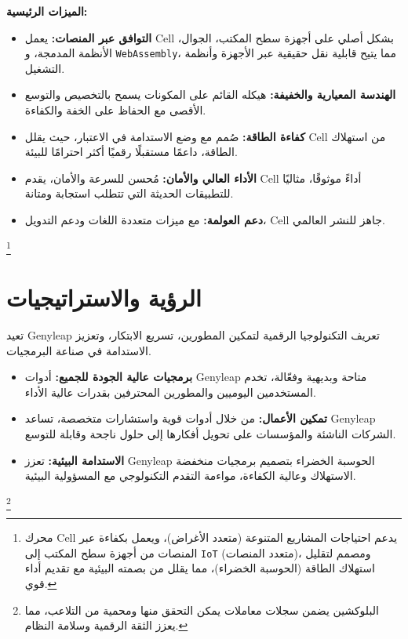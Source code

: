 \documentclass[a4paper,12pt,openany]{book}
\begin{document}
\textbf{الميزات الرئيسية:}
\begin{itemize}
    \item \textbf{التوافق عبر المنصات:} يعمل Cell بشكل أصلي على أجهزة سطح المكتب، الجوال، الأنظمة المدمجة، و \texttt{WebAssembly}، مما يتيح قابلية نقل حقيقية عبر الأجهزة وأنظمة التشغيل.
    \item \textbf{الهندسة المعيارية والخفيفة:} هيكله القائم على المكونات يسمح بالتخصيص والتوسع الأقصى مع الحفاظ على الخفة والكفاءة.
    \item \textbf{كفاءة الطاقة:} صُمم مع وضع الاستدامة في الاعتبار، حيث يقلل Cell من استهلاك الطاقة، داعمًا مستقبلًا رقميًا أكثر احترامًا للبيئة.
    \item \textbf{الأداء العالي والأمان:} مُحسن للسرعة والأمان، يقدم Cell أداءً موثوقًا، مثاليًا للتطبيقات الحديثة التي تتطلب استجابة ومتانة.
    \item \textbf{دعم العولمة:} مع ميزات متعددة اللغات ودعم التدويل، Cell جاهز للنشر العالمي.
\end{itemize}

\footnote{محرك Cell يدعم احتياجات المشاريع المتنوعة (متعدد الأغراض)، ويعمل بكفاءة عبر المنصات من أجهزة سطح المكتب إلى \texttt{IoT} (متعدد المنصات)، ومصمم لتقليل استهلاك الطاقة (الحوسبة الخضراء)، مما يقلل من بصمته البيئية مع تقديم أداء قوي.}

\chapter{الرؤية والاستراتيجيات}

تعيد Genyleap تعريف التكنولوجيا الرقمية لتمكين المطورين، تسريع الابتكار، وتعزيز الاستدامة في صناعة البرمجيات.

\begin{itemize}
    \item \textbf{برمجيات عالية الجودة للجميع:} أدوات Genyleap متاحة وبديهية وفعّالة، تخدم المستخدمين اليوميين والمطورين المحترفين بقدرات عالية الأداء.
    \item \textbf{تمكين الأعمال:} من خلال أدوات قوية واستشارات متخصصة، تساعد Genyleap الشركات الناشئة والمؤسسات على تحويل أفكارها إلى حلول ناجحة وقابلة للتوسع.
    \item \textbf{الاستدامة البيئية:} تعزز Genyleap الحوسبة الخضراء بتصميم برمجيات منخفضة الاستهلاك وعالية الكفاءة، مواءمة التقدم التكنولوجي مع المسؤولية البيئية.
\end{itemize}

\footnote{البلوكشين يضمن سجلات معاملات يمكن التحقق منها ومحمية من التلاعب، مما يعزز الثقة الرقمية وسلامة النظام.}
\end{document}
